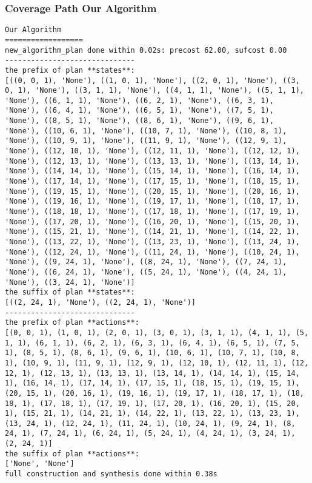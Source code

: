 \subsubsection*{Coverage Path Our Algorithm}
\begin{lstlisting}
Our Algorithm
==================
new_algorithm_plan done within 0.02s: precost 62.00, sufcost 0.00
------------------------------
the prefix of plan **states**:
[((0, 0, 1), 'None'), ((1, 0, 1), 'None'), ((2, 0, 1), 'None'), ((3, 0, 1), 'None'), ((3, 1, 1), 'None'), ((4, 1, 1), 'None'), ((5, 1, 1), 'None'), ((6, 1, 1), 'None'), ((6, 2, 1), 'None'), ((6, 3, 1), 'None'), ((6, 4, 1), 'None'), ((6, 5, 1), 'None'), ((7, 5, 1), 'None'), ((8, 5, 1), 'None'), ((8, 6, 1), 'None'), ((9, 6, 1), 'None'), ((10, 6, 1), 'None'), ((10, 7, 1), 'None'), ((10, 8, 1), 'None'), ((10, 9, 1), 'None'), ((11, 9, 1), 'None'), ((12, 9, 1), 'None'), ((12, 10, 1), 'None'), ((12, 11, 1), 'None'), ((12, 12, 1), 'None'), ((12, 13, 1), 'None'), ((13, 13, 1), 'None'), ((13, 14, 1), 'None'), ((14, 14, 1), 'None'), ((15, 14, 1), 'None'), ((16, 14, 1), 'None'), ((17, 14, 1), 'None'), ((17, 15, 1), 'None'), ((18, 15, 1), 'None'), ((19, 15, 1), 'None'), ((20, 15, 1), 'None'), ((20, 16, 1), 'None'), ((19, 16, 1), 'None'), ((19, 17, 1), 'None'), ((18, 17, 1), 'None'), ((18, 18, 1), 'None'), ((17, 18, 1), 'None'), ((17, 19, 1), 'None'), ((17, 20, 1), 'None'), ((16, 20, 1), 'None'), ((15, 20, 1), 'None'), ((15, 21, 1), 'None'), ((14, 21, 1), 'None'), ((14, 22, 1), 'None'), ((13, 22, 1), 'None'), ((13, 23, 1), 'None'), ((13, 24, 1), 'None'), ((12, 24, 1), 'None'), ((11, 24, 1), 'None'), ((10, 24, 1), 'None'), ((9, 24, 1), 'None'), ((8, 24, 1), 'None'), ((7, 24, 1), 'None'), ((6, 24, 1), 'None'), ((5, 24, 1), 'None'), ((4, 24, 1), 'None'), ((3, 24, 1), 'None')]
the suffix of plan **states**:
[((2, 24, 1), 'None'), ((2, 24, 1), 'None')]
------------------------------
the prefix of plan **actions**:
[(0, 0, 1), (1, 0, 1), (2, 0, 1), (3, 0, 1), (3, 1, 1), (4, 1, 1), (5, 1, 1), (6, 1, 1), (6, 2, 1), (6, 3, 1), (6, 4, 1), (6, 5, 1), (7, 5, 1), (8, 5, 1), (8, 6, 1), (9, 6, 1), (10, 6, 1), (10, 7, 1), (10, 8, 1), (10, 9, 1), (11, 9, 1), (12, 9, 1), (12, 10, 1), (12, 11, 1), (12, 12, 1), (12, 13, 1), (13, 13, 1), (13, 14, 1), (14, 14, 1), (15, 14, 1), (16, 14, 1), (17, 14, 1), (17, 15, 1), (18, 15, 1), (19, 15, 1), (20, 15, 1), (20, 16, 1), (19, 16, 1), (19, 17, 1), (18, 17, 1), (18, 18, 1), (17, 18, 1), (17, 19, 1), (17, 20, 1), (16, 20, 1), (15, 20, 1), (15, 21, 1), (14, 21, 1), (14, 22, 1), (13, 22, 1), (13, 23, 1), (13, 24, 1), (12, 24, 1), (11, 24, 1), (10, 24, 1), (9, 24, 1), (8, 24, 1), (7, 24, 1), (6, 24, 1), (5, 24, 1), (4, 24, 1), (3, 24, 1), (2, 24, 1)]
the suffix of plan **actions**:
['None', 'None']
full construction and synthesis done within 0.38s 
\end{lstlisting}



